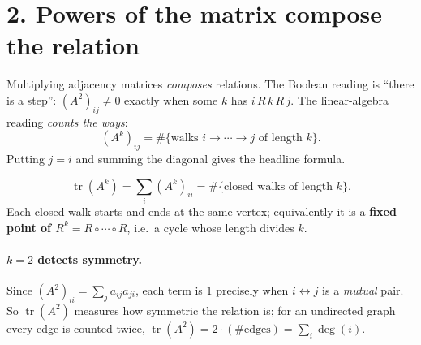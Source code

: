 \documentclass[11pt]{article}
\newcommand{\tr}{\operatorname{tr}}
\newcommand{\smallmat}[1]{\left(\begin{smallmatrix}#1\end{smallmatrix}\right)}
\begin{document}
\begin{center}
\end{center}

\section*{2. Powers of the matrix compose the relation}

Multiplying adjacency matrices \emph{composes} relations. The Boolean reading
is ``there is a step'': $(A^{2})_{ij}\neq0$ exactly when some $k$ has
$i\,R\,k\,R\,j$. The linear-algebra reading \emph{counts the ways}:
\[
(A^{k})_{ij}=\#\{\text{walks } i\to\cdots\to j \text{ of length }k\}.
\]
Putting $j=i$ and summing the diagonal gives the headline formula.

\begin{note}
\[
\boxed{\;\tr(A^{k})=\sum_{i}(A^{k})_{ii}
=\#\{\text{closed walks of length }k\}.\;}
\]
Each closed walk starts and ends at the same vertex; equivalently it is a
\textbf{fixed point of $R^{k}=R\circ\cdots\circ R$}, i.e.\ a cycle whose length
divides $k$.
\end{note}

\paragraph{$k=2$ detects symmetry.}
Since $(A^{2})_{ii}=\sum_j a_{ij}a_{ji}$, each term is $1$ precisely when
$i\leftrightarrow j$ is a \emph{mutual} pair. So $\tr(A^{2})$ measures how
symmetric the relation is; for an undirected graph every edge is counted twice,
$\tr(A^{2})=2\cdot(\#\text{edges})=\sum_i \deg(i)$.
\end{document}
